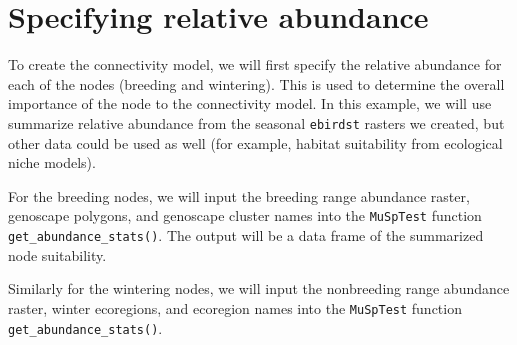 \documentclass[
]{book}
\newenvironment{Shaded}{\begin{snugshade}}{\end{snugshade}}
\newcommand{\AttributeTok}[1]{\textcolor[rgb]{0.77,0.63,0.00}{#1}}
\newcommand{\DocumentationTok}[1]{\textcolor[rgb]{0.56,0.35,0.01}{\textbf{\textit{#1}}}}
\newcommand{\FunctionTok}[1]{\textcolor[rgb]{0.00,0.00,0.00}{#1}}
\newcommand{\NormalTok}[1]{#1}
\newcommand{\OtherTok}[1]{\textcolor[rgb]{0.56,0.35,0.01}{#1}}
\newcommand{\SpecialCharTok}[1]{\textcolor[rgb]{0.00,0.00,0.00}{#1}}
\newcommand{\StringTok}[1]{\textcolor[rgb]{0.31,0.60,0.02}{#1}}
\begin{document}
\hypertarget{specifying-relative-abundance}{%
\section{Specifying relative abundance}\label{specifying-relative-abundance}}

To create the connectivity model, we will first specify the relative abundance for each of the nodes (breeding and wintering). This is used to determine the overall importance of the node to the connectivity model. In this example, we will use summarize relative abundance from the seasonal \texttt{ebirdst} rasters we created, but other data could be used as well (for example, habitat suitability from ecological niche models).

For the breeding nodes, we will input the breeding range abundance raster, genoscape polygons, and genoscape cluster names into the \texttt{MuSpTest} function \texttt{get\_abundance\_stats()}. The output will be a data frame of the summarized node suitability.

\begin{Shaded}
\end{Shaded}

Similarly for the wintering nodes, we will input the nonbreeding range abundance raster, winter ecoregions, and ecoregion names into the \texttt{MuSpTest} function \texttt{get\_abundance\_stats()}.
\end{document}
